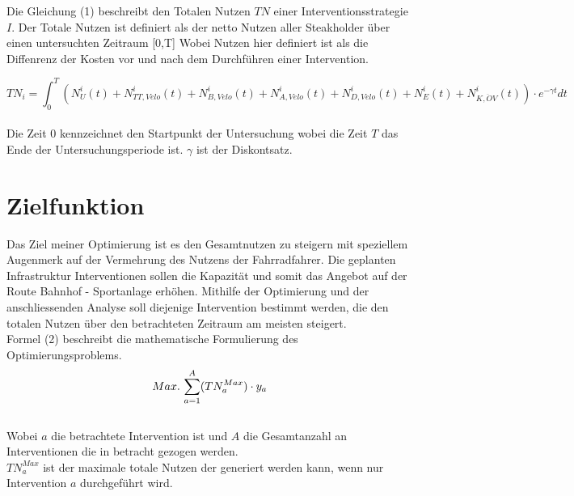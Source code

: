 Die Gleichung (1) beschreibt den Totalen Nutzen $TN$ einer Interventionsstrategie $I$. Der Totale Nutzen ist definiert als der netto Nutzen aller Steakholder über einen untersuchten Zeitraum [0,T] \newline
Wobei Nutzen hier definiert ist als die Diffenrenz der Kosten vor und nach dem Durchführen einer Intervention. 

\begin{equation}
    TN_{i} = \int_{0}^{T} (N_{U}^i(t) + N_{TT,Velo}^i(t) + N_{B,Velo}^i(t) +
    N_{A,Velo}^i(t) + N_{D,Velo}^i(t) + N_E^i(t) + N_{K,\ddot{O}V}^i(t)) \cdot e^{-\gamma t} dt
\end{equation} \\ [2ex]

Die Zeit $0$ kennzeichnet den Startpunkt der Untersuchung wobei die Zeit $T$ das Ende der Untersuchungsperiode ist. $\gamma$ ist der Diskontsatz.


\newpage





 
\section{\textbf{{Zielfunktion}}}

Das Ziel meiner Optimierung ist es den Gesamtnutzen zu steigern mit speziellem Augenmerk auf der Vermehrung des Nutzens der Fahrradfahrer. \newline
Die geplanten Infrastruktur Interventionen sollen die Kapazität und somit das Angebot auf der Route Bahnhof - Sportanlage erhöhen. \newline
Mithilfe der Optimierung und der anschliessenden Analyse soll diejenige Intervention bestimmt werden, die den totalen Nutzen über den betrachteten Zeitraum am meisten steigert. \\ [4ex]




Formel (2) beschreibt die mathematische Formulierung des Optimierungsproblems.
\\ [2ex]
\begin{equation}
    Max.\thinspace\sum_{a=1}^{A} (TN_{a}^{Max}) \cdot {y_a}
\end{equation} \\ [2ex]

Wobei ${a}$ die betrachtete Intervention ist und ${A}$ die Gesamtanzahl an Interventionen die in betracht gezogen werden. \\ [2ex]
$TN_a^{Max}$ ist der maximale totale Nutzen der generiert werden kann, wenn nur Intervention ${a}$ durchgeführt wird.



%

